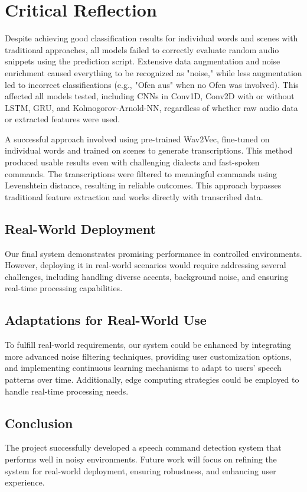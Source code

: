 \section{Critical Reflection}
Despite achieving good classification results for individual words and scenes with traditional approaches,
all models failed to correctly evaluate random audio snippets using the prediction script.
Extensive data augmentation and noise enrichment caused everything to be recognized as "noise,"
while less augmentation led to incorrect classifications (e.g., "Ofen aus" when no Ofen was involved).
This affected all models tested, including CNNs in Conv1D, Conv2D with or without LSTM, GRU, and Kolmogorov-Arnold-NN,
regardless of whether raw audio data or extracted features were used.

A successful approach involved using pre-trained Wav2Vec, fine-tuned on individual words and trained on scenes to generate transcriptions.
This method produced usable results even with challenging dialects and fast-spoken commands.
The transcriptions were filtered to meaningful commands using Levenshtein distance, resulting in reliable outcomes.
This approach bypasses traditional feature extraction and works directly with transcribed data.

\subsection{Real-World Deployment}
Our final system demonstrates promising performance in controlled environments.
However, deploying it in real-world scenarios would require addressing several challenges, including handling diverse accents,
background noise, and ensuring real-time processing capabilities.

\subsection{Adaptations for Real-World Use}
To fulfill real-world requirements, our system could be enhanced by integrating more advanced noise filtering techniques,
providing user customization options, and implementing continuous learning mechanisms to adapt to users' speech patterns over time.
Additionally, edge computing strategies could be employed to handle real-time processing needs.

\subsection{Conclusion}
The project successfully developed a speech command detection system that performs well in noisy environments.
Future work will focus on refining the system for real-world deployment, ensuring robustness, and enhancing user experience.

